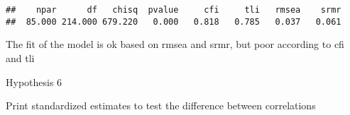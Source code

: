 \documentclass[
]{article}
\newenvironment{Shaded}{\begin{snugshade}}{\end{snugshade}}
\newcommand{\KeywordTok}[1]{\textcolor[rgb]{0.13,0.29,0.53}{\textbf{#1}}}
\newcommand{\NormalTok}[1]{#1}
\newcommand{\OperatorTok}[1]{\textcolor[rgb]{0.81,0.36,0.00}{\textbf{#1}}}
\newcommand{\StringTok}[1]{\textcolor[rgb]{0.31,0.60,0.02}{#1}}
\begin{document}
\begin{verbatim}
##    npar      df   chisq  pvalue     cfi     tli   rmsea    srmr 
##  85.000 214.000 679.220   0.000   0.818   0.785   0.037   0.061
\end{verbatim}

The fit of the model is ok based on rmsea and srmr, but poor according
to cfi and tli

Hypothesis 6

Print standardized estimates to test the difference between correlations

\begin{Shaded}
\end{Shaded}
\end{document}
